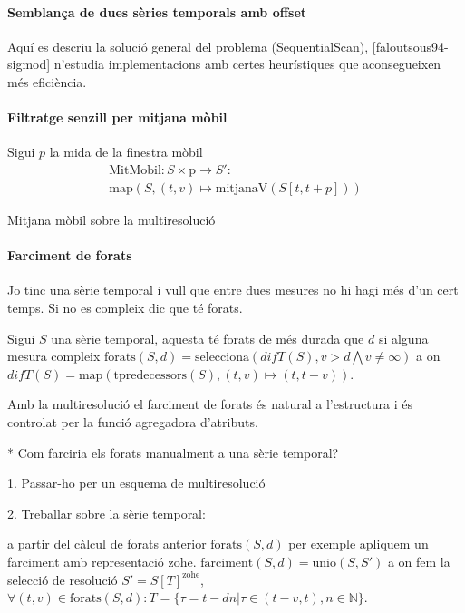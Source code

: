 \paragraph{Semblança de dues sèries temporals amb offset}

Aquí es descriu la solució general del problema (SequentialScan),
[faloutsous94-sigmod] n'estudia implementacions amb certes
heurístiques que aconsegueixen més eficiència.





\paragraph{Filtratge senzill per mitjana mòbil}

Sigui $p$ la mida de la finestra mòbil
\begin{gather*}
  \text{MitMobil}: S \times \text{p} \longrightarrow S':\\
  \text{map}(S,(t,v)\mapsto \text{mitjanaV}(S[t,t+p]))
\end{gather*}


Mitjana mòbil sobre la multiresolució



\paragraph{Farciment de forats}

Jo tinc una sèrie temporal i vull que entre dues mesures no hi hagi més d'un cert temps. Si no es compleix dic que té forats. 

Sigui $S$ una sèrie temporal, aquesta té forats de més durada que $d$
si alguna mesura compleix $\text{forats}(S,d) = \text{selecciona}(difT(S),v>d \bigwedge v\neq\infty)$ a on $difT(S) = \text{map}(\text{tpredecessors}(S),(t,v)\mapsto(t,t-v))$.

Amb la multiresolució el farciment de forats és natural a l'estructura i és controlat per la funció agregadora d'atributs.


* Com farciria els forats manualment a una sèrie temporal?

1. Passar-ho per un esquema de multiresolució

2. Treballar sobre la sèrie temporal:

a partir del càlcul de forats anterior $\text{forats}(S,d)$ per
exemple apliquem un farciment amb representació
zohe. $\text{farciment}(S,d) = \text{unio}(S,S')$ a on fem la selecció
de resolució $S' = S[T]^{\text{zohe}}$, $\forall (t,v) \in
\text{forats}(S,d): T = \{ \tau = t - dn |
\tau\in(t-v,t),n\in\mathbb{N} \}$.







